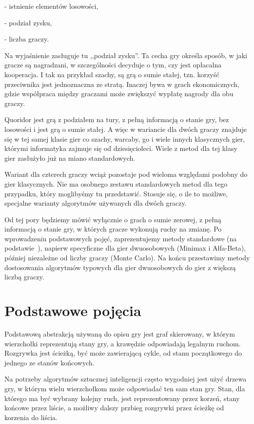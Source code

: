\documentclass{pracamgr}
\begin{document}
 - istnienie elementów losowości,

 - podział zysku,

 - liczba graczy.

Na wyjaśnienie zasługuje tu ,,podział zysku''.
Ta cecha gry określa sposób, w jaki gracze są nagradzani, w szczególności decyduje o tym, czy jest opłacalna kooperacja. I tak na przykład szachy, są grą o sumie stałej, tzn. korzyść przeciwnika jest jednoznaczna ze stratą. Inaczej bywa w grach ekonomicznych, gdzie współpraca między graczami może zwiększyć wypłatę nagrody dla obu graczy.

Quoridor jest grą z podziałem na tury, z pełną informacją o stanie gry, bez losowości i jest grą o sumie stałej.
A więc w wariancie dla dwóch graczy znajduje się w tej samej klasie gier co szachy, warcaby, go i wiele innych klasycznych gier, którymi informatyka zajmuje się od dziesięcioleci.
Wiele z metod dla tej klasy gier zasłużyło już na miano standardowych.

Wariant dla czterech graczy wciąż pozostaje pod wieloma względami podobny do gier klasycznych.
Nie ma osobnego zestawu standardowych metod dla tego przypadku, który moglibyśmy tu przedstawić.
Stosuje się, o ile to możliwe, specjalne warianty algorytmów używanych dla dwóch graczy.

Od tej pory będziemy mówić wyłącznie o grach o sumie zerowej, z pełną informacją o stanie gry, w których gracze wykonują ruchy na zmianę.
Po wprowadzeniu podstawowych pojęć, zaprezentujemy metody standardowe (na podstawie~\cite{pawlewicz}), napierw specyficzne dla gier dwuosobowych (Minimax i Alfa-Beta), później niezależne od liczby graczy (Monte Carlo).
Na końcu przestawimy metody dostosowania algorytmów typowych dla gier dwuosobowych do gier z większą liczbą graczy.

\section{Podstawowe pojęcia}

Podstawową abstrakcją używaną do opisu gry jest graf skierowany, w którym wierzchołki reprezentują stany gry, a krawędzie odpowiadają legalnym ruchom.
Rozgrywka jest ścieżką, być może zawierającą cykle, od stanu początkowego do jednego ze stanów końcowych.

Na potrzeby algorytmów sztucznej inteligencji często wygodniej jest użyć drzewa gry, w którym wielu wierzchołkom może odpowiadać ten sam stan gry.
Stan, dla którego ma być wybrany kolejny ruch, jest reprezentowany przez korzeń, stany końcowe przez liście, a możliwy dalszy przbieg rozgrywki przez ścieżkę od korzenia do liścia.
\end{document}

